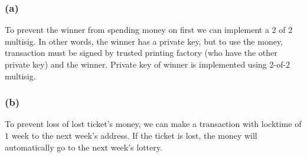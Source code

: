 \documentclass[a4paper]{article}
\begin{document}
\subsubsection*{(a)}
To prevent the winner from spending money on first we can implement a $2$  of $2$ multisig. In other words,
the winner has a private key, but to use the money, transaction must be signed by trusted printing factory
(who have the other private key) and the winner. Private key of winner is implemented using 2-of-2 multisig.

\subsubsection*{(b)}
To prevent loss of lost ticket's money, we can make a transaction with locktime of $1$ week to the next week's
address. If the ticket is lost, the money will automatically go to the next week's lottery.
\end{document}
